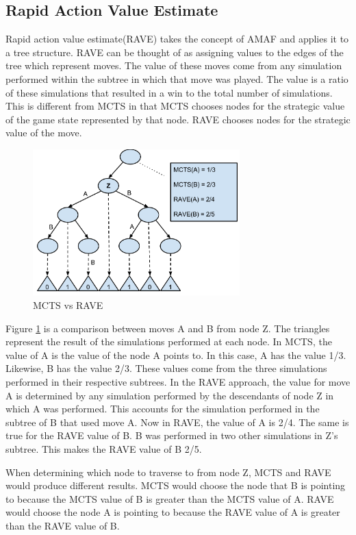 \documentclass{sig-alternate}
\begin{document}
\subsection{Rapid Action Value Estimate}
Rapid action value estimate(RAVE) takes the concept of AMAF and applies it to a tree structure. RAVE can be thought of as assigning values to the edges of the tree which represent moves. The value of these moves come from any simulation performed within the subtree in which that move was played. The value is a ratio of these simulations that resulted in a win to the total number of simulations. This is different from MCTS in that MCTS chooses nodes for the strategic value of the game state represented by that node. RAVE chooses nodes for the strategic value of the move.

\begin{figure}[h]
	\includegraphics[width=8cm]{RAVEDiagram.pdf}
	\centering
	\caption{MCTS vs RAVE}
	\label{fig:RAVEDiagram}
\end{figure}

Figure \ref{fig:RAVEDiagram} is a comparison between moves A and B from node Z. The triangles represent the result of the simulations performed at each node. In MCTS, the value of A is the value of the node A points to. In this case, A has the value 1/3. Likewise, B has the value 2/3. These values come from the three simulations performed in their respective subtrees. In the RAVE approach, the value for move A is determined by any simulation performed by the descendants of node Z in which A was performed. This accounts for the simulation performed in the subtree of B that used move A. Now in RAVE, the value of A is 2/4. The same is true for the RAVE value of B. B was performed in two other simulations in Z's subtree. This makes the RAVE value of B 2/5.

When determining which node to traverse to from node Z, MCTS and RAVE would produce different results. MCTS would choose the node that B is pointing to because the MCTS value of B is greater than the MCTS value of A. RAVE would choose the node A is pointing to because the RAVE value of A is greater than the RAVE value of B.   
\end{document}
